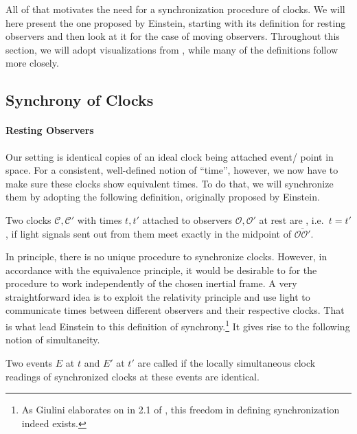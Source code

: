 All of that motivates the need for a synchronization procedure of clocks. We will here present the one proposed by Einstein, starting with its definition for resting observers and then look at it for the case of moving observers. Throughout this section, we will adopt visualizations from \cite{dragon_geometry_srt}, while many of the definitions follow \cite{giulini_srt} more closely.



		\subsection{Synchrony of Clocks}
			\paragraph{Resting Observers}
Our setting is identical copies of an ideal clock being attached event/ point in space. For a consistent, well-defined notion of \enquote{time}, however, we now have to make sure these clocks show equivalent times. To do that, we will synchronize them by adopting the following definition, originally proposed by Einstein.

\begin{defi}\label{defi:einstein_synchrony}
Two clocks $\mathcal{C}, \mathcal{C}'$ with times $t, t'$ attached to observers $\mathcal{O}, \mathcal{O}'$ at rest are , i.e.~$t = t'$, if light signals sent out from them meet exactly in the midpoint of $\overline{\mathcal{O} \mathcal{O}'}$.
\end{defi}
In principle, there is no unique procedure to synchronize clocks. However, in accordance with the equivalence principle, it would be desirable to for the procedure to work independently of the chosen inertial frame. A very straightforward idea is to exploit the relativity principle and use light to communicate times between different observers and their respective clocks. That is what lead Einstein to this definition of synchrony.\footnote{As Giulini elaborates on in 2.1 of \cite{giulini_srt}, this freedom in defining synchronization indeed exists.} It gives rise to the following notion of simultaneity.
\begin{defi}[Simultaneity]\label{defi:simultaneity}
Two events $E$ at $t$ and $E'$ at $t'$ are called  if the locally simultaneous clock readings of synchronized clocks at these events are identical.%
\end{defi}

